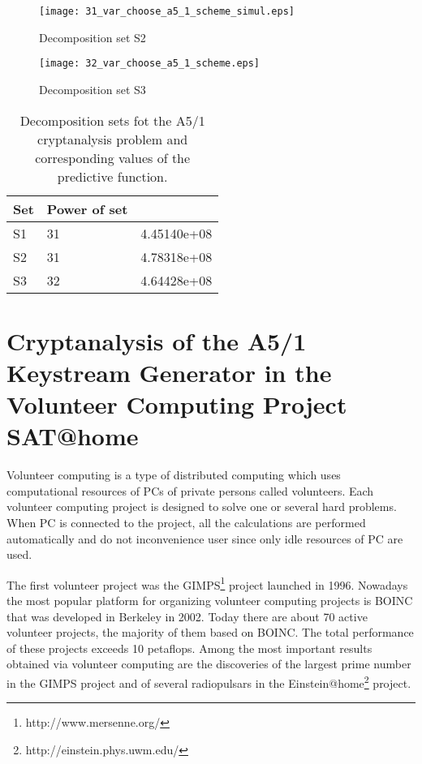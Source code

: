 \documentclass[runningheads,a4paper]{llncs}
\begin{document}
\begin{figure}[!ht]
	\centering
		\texttt{[image: 31\_var\_choose\_a5\_1\_scheme\_simul.eps]}
	\caption{Decomposition set S2}
	\label{a5_1_set_S2}
\end{figure}

\begin{figure}[!ht]
	\centering
		\texttt{[image: 32\_var\_choose\_a5\_1\_scheme.eps]}
	\caption{Decomposition set S3}
	\label{a5_1_set_S3}
\end{figure}

\begin{table}
\caption{Decomposition sets fot the A5/1 cryptanalysis problem and corresponding values of the predictive function. }
\label{a5-1_results}
\centering
\begin{tabular}{p{1.8cm}|p{1.8cm}|p{1.8cm}}
Set & Power of set & \\
\hline 
\hline
S1 & 31 & 4.45140e+08 \\
\hline 
S2 & 31 & 4.78318e+08 \\
\hline 
S3 & 32 & 4.64428e+08 \\
\end{tabular}
\end{table}

\section{Cryptanalysis of the A5/1 Keystream Generator  in the Volunteer Computing Project SAT@home}

Volunteer computing \cite{DBLP:journals/jnca/DurraniS14} is a type of distributed computing which uses computational resources of PCs of private persons called volunteers. Each volunteer computing project is designed to solve one or several hard problems. When PC is connected to the project, all the calculations are performed automatically and do not inconvenience user since only idle resources of PC are used.

The first volunteer project was the GIMPS\footnote{http://www.mersenne.org/} project launched in 1996. Nowadays the most popular platform for organizing volunteer computing projects is BOINC \cite{DBLP:conf/grid/Anderson04} that was developed in Berkeley in 2002. Today there are about 70 active volunteer projects, the majority of them based on BOINC. The total performance of these projects exceeds 10 petaflops. Among the most important results obtained via volunteer computing are the discoveries of the largest prime number in the GIMPS project and of several radiopulsars in the Einstein@home\footnote{http://einstein.phys.uwm.edu/} project. 
\end{document}
